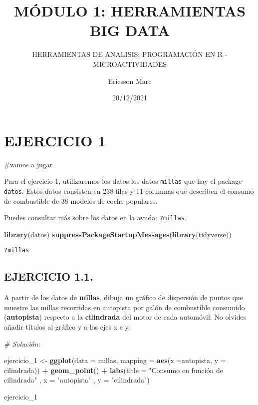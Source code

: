 \documentclass[]{article}
\title{MÓDULO 1: HERRAMIENTAS BIG DATA}
\subtitle{HERRAMIENTAS DE ANALISIS: PROGRAMACIÓN EN R - MICROACTIVIDADES}
\author{Ericsson Marc}
\date{20/12/2021}
\newenvironment{Shaded}{\begin{snugshade}}{\end{snugshade}}
\newcommand{\CommentTok}[1]{\textcolor[rgb]{0.56,0.35,0.01}{\textit{#1}}}
\newcommand{\DataTypeTok}[1]{\textcolor[rgb]{0.13,0.29,0.53}{#1}}
\newcommand{\DecValTok}[1]{\textcolor[rgb]{0.00,0.00,0.81}{#1}}
\newcommand{\KeywordTok}[1]{\textcolor[rgb]{0.13,0.29,0.53}{\textbf{#1}}}
\newcommand{\NormalTok}[1]{#1}
\newcommand{\OperatorTok}[1]{\textcolor[rgb]{0.81,0.36,0.00}{\textbf{#1}}}
\newcommand{\StringTok}[1]{\textcolor[rgb]{0.31,0.60,0.02}{#1}}
\begin{document}
\maketitle

\hypertarget{ejercicio-1}{%
\section{EJERCICIO 1}\label{ejercicio-1}}

\#vamos a jugar

Para el ejercicio 1, utilizaremos los datos los datos \texttt{millas}
que hay el package \texttt{datos}. Estos datos consisten en 238 filas y
11 columnas que describen el consumo de combustible de 38 modelos de
coche populares.

Puedes consultar más sobre los datos en la ayuda: \texttt{?millas}.

\begin{Shaded}
\begin{Highlighting}[]
\KeywordTok{library}\NormalTok{(datos)}
\KeywordTok{suppressPackageStartupMessages}\NormalTok{(}\KeywordTok{library}\NormalTok{(tidyverse))}
\end{Highlighting}
\end{Shaded}

\begin{verbatim}
?millas
\end{verbatim}

\hypertarget{ejercicio-1.1.}{%
\subsection{EJERCICIO 1.1.}\label{ejercicio-1.1.}}

A partir de los datos de \textbf{millas}, dibuja un gráfico de
dispersión de puntos que muestre las millas recorridas en autopista por
galón de combustible consumido (\textbf{autopista}) respecto a la
\textbf{cilindrada} del motor de cada automóvil. No olvides añadir
títulos al gráfico y a los ejes x e y.

\begin{Shaded}
\begin{Highlighting}[]
\CommentTok{# Solución:}

\NormalTok{ejercicio_}\DecValTok{1}\NormalTok{ <-}\StringTok{ }\KeywordTok{ggplot}\NormalTok{(}\DataTypeTok{data =}\NormalTok{ millas, }\DataTypeTok{mapping =} \KeywordTok{aes}\NormalTok{(}\DataTypeTok{x =}\NormalTok{autopista, }\DataTypeTok{y =}\NormalTok{ cilindrada)) }\OperatorTok{+}\StringTok{ }
\StringTok{  }\KeywordTok{geom_point}\NormalTok{() }\OperatorTok{+}
\StringTok{  }\KeywordTok{labs}\NormalTok{(}\DataTypeTok{title =} \StringTok{"Consumo en función de cilindrada"}
\NormalTok{       , }\DataTypeTok{x =} \StringTok{"autopista"}
\NormalTok{       , }\DataTypeTok{y =} \StringTok{"cilindrada"}\NormalTok{)}
  
\NormalTok{ejercicio_}\DecValTok{1}
\end{Highlighting}
\end{Shaded}
\end{document}
